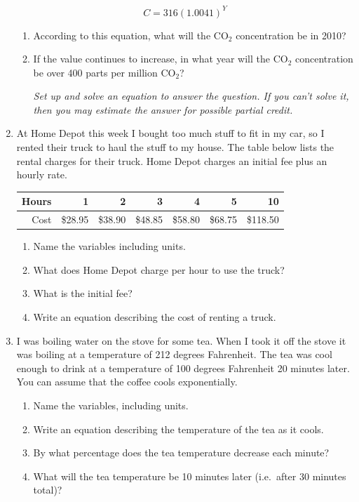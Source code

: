 \documentclass[12pt]{article}
\begin{document}
\begin{enumerate}
$$C=316(1.0041)^Y$$

\begin{enumerate}
\item According to this equation, what will the CO$_{2}$ concentration be in 2010?
\vfill
\item If the value continues to increase, in what year will the CO$_{2}$ concentration be over 400 parts per million CO$_{2}$?

\emph{Set up and solve an equation to answer the question.  If you can't solve it, then you may estimate the answer for possible partial credit.}
\vfill
\vfill
\vfill
\end{enumerate}


\newpage %

\item At Home Depot this week I bought too much stuff to fit in my car, so I rented their truck to haul the stuff to my house.  The table below lists the rental charges for their truck.  Home Depot charges an initial fee plus an hourly rate.

\begin{center}
\begin{tabular} {|r|r|r|r|r|r|r|} \hline
Hours & 1 & 2 & 3 & 4 & 5 & 10 \\ \hline
Cost & \$28.95 & \$38.90 & \$48.85 & \$58.80 & \$68.75 & \$118.50 \\ \hline
\end{tabular}
\end{center}

\begin{enumerate}
\item Name the variables including units.
\vfill
\item What does Home Depot charge per hour to use the truck?
\vfill
\item What is the initial fee?
\vfill
\item Write an equation describing the cost of renting a truck.
\vfill
\end{enumerate}

\newpage %

\item I was boiling water on the stove for some tea.  When I took it off the stove it was boiling at a temperature of 212 degrees Fahrenheit. The tea was cool enough to drink at a temperature of 100 degrees Fahrenheit 20 minutes later. You can assume that the coffee cools exponentially.

\begin{enumerate}
\item Name the variables, including units.
\vfill
\item Write an equation describing the temperature of the tea as it cools.
\vfill
\item By what percentage does the tea temperature decrease each minute?
\vfill
\item What will the tea temperature be 10 minutes later (i.e.\ after 30 minutes total)?
\vfill
\end{enumerate}



\end{enumerate}
\end{document}
